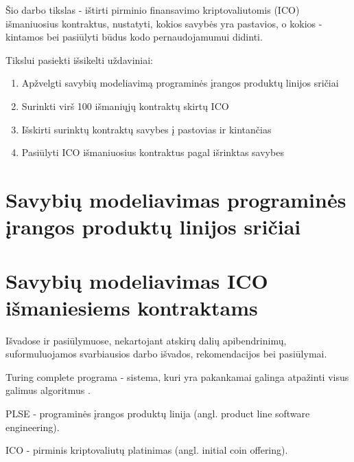 \documentclass{VUMIFInfKursinis}
\begin{document}
Šio darbo tikslas - ištirti pirminio finansavimo kriptovaliutomis (ICO) išmaniuosius kontraktus, nustatyti, kokios savybės yra pastavios, o kokios - kintamos bei pasiūlyti būdus kodo pernaudojamumui didinti. 

Tikslui pasiekti išsikelti uždaviniai:
\begin{enumerate}
\item Apžvelgti savybių modeliavimą programinės įrangos produktų linijos sričiai 
\item Surinkti virš 100 išmaniųjų kontraktų skirtų ICO
\item Išskirti surinktų kontraktų savybes į pastovias ir kintančias
\item Pasiūlyti ICO išmaniuosius kontraktus pagal išrinktas savybes
\end{enumerate}

\section{Savybių modeliavimas programinės įrangos produktų linijos sričiai}
\section{Savybių modeliavimas ICO išmaniesiems kontraktams}





Išvadose ir pasiūlymuose, nekartojant atskirų dalių apibendrinimų,
suformuluojamos svarbiausios darbo išvados, rekomendacijos bei pasiūlymai.



\printbibliography[heading=bibintoc] %

Turing complete programa - sistema, kuri yra pakankamai galinga atpažinti visus galimus algoritmus \cite{Teller1994}. 

PLSE - programinės įrangos produktų linija (angl. product line software engineering).

ICO - pirminis kriptovaliutų platinimas (angl. initial coin offering).

\appendix  %
%
\end{document}
